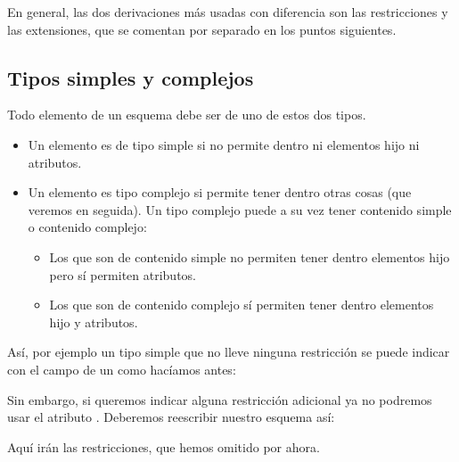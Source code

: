 \documentclass[letterpaper,10pt,spanish]{sphinxmanual}
\begin{document}
En general, las dos derivaciones más usadas con diferencia son las restricciones y las extensiones, que se comentan por separado en los puntos siguientes.


\subsection{Tipos simples y complejos}
\label{\detokenize{tema5:tipos-simples-y-complejos}}
Todo elemento de un esquema debe ser de uno de estos dos tipos.
\begin{itemize}
\item {} 
Un elemento es de tipo simple si no permite dentro ni elementos hijo ni atributos.

\item {} 
Un elemento es tipo complejo si permite tener dentro otras cosas (que veremos en seguida). Un tipo complejo puede a su vez tener contenido simple o contenido complejo:
\begin{itemize}
\item {} 
Los que son de contenido simple no permiten tener dentro elementos hijo pero sí permiten atributos.

\item {} 
Los que son de contenido complejo sí permiten tener dentro elementos hijo y atributos.

\end{itemize}

\end{itemize}

Así, por ejemplo un tipo simple que no lleve ninguna restricción se puede indicar con el campo  de un  como hacíamos antes:

\begin{sphinxVerbatim}[commandchars=\\\{\}]
 
     
\end{sphinxVerbatim}

Sin embargo, si queremos indicar alguna restricción adicional ya no podremos usar el atributo . Deberemos reescribir nuestro esquema así:

\begin{sphinxVerbatim}[commandchars=\\\{\}]
 
    Aquí irán las restricciones, que hemos omitido por ahora.
\end{sphinxVerbatim}
\end{document}
